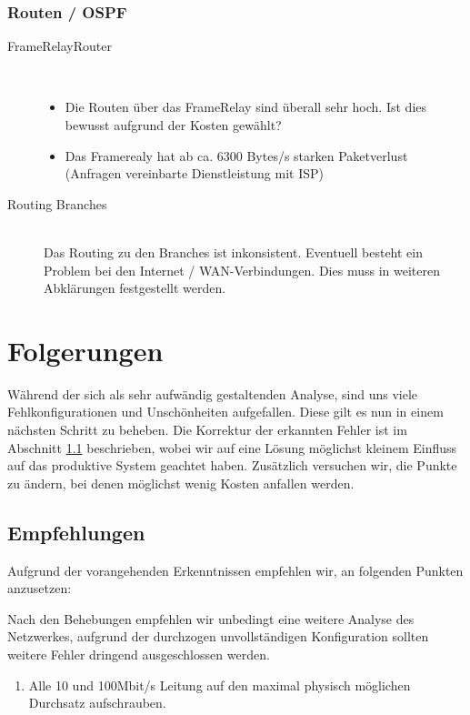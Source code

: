\subsubsection{Routen / OSPF}

\begin{description}
	\item[FrameRelayRouter] \hfill \\
		\begin{itemize}
			\item Die Routen über das FrameRelay sind überall sehr hoch. Ist dies bewusst aufgrund der Kosten gewählt?
			\item Das Framerealy hat ab ca. 6300 Bytes/s starken Paketverlust (Anfragen vereinbarte Dienstleistung mit ISP)
		\end{itemize}
	\item[Routing Branches] \hfill \\
		Das Routing zu den Branches ist inkonsistent. Eventuell besteht ein Problem bei den Internet / WAN-Verbindungen. Dies muss in weiteren Abklärungen festgestellt werden.
\end{description}

\section{Folgerungen}
Während der sich als sehr aufwändig gestaltenden Analyse, sind uns viele Fehlkonfigurationen und Unschönheiten aufgefallen. Diese gilt es nun in einem nächsten Schritt zu beheben. Die Korrektur der erkannten Fehler ist im Abschnitt \ref{sec:recommedations} beschrieben, wobei wir auf eine Lösung möglichst kleinem Einfluss auf das produktive System geachtet haben. Zusätzlich versuchen wir, die Punkte zu ändern, bei denen möglichst wenig Kosten anfallen werden.

\subsection{Empfehlungen}
\label{sec:recommedations}
Aufgrund der vorangehenden Erkenntnissen empfehlen wir, an folgenden Punkten anzusetzen:

Nach den Behebungen empfehlen wir unbedingt eine weitere Analyse des Netzwerkes, aufgrund der durchzogen unvollständigen Konfiguration sollten weitere Fehler dringend ausgeschlossen werden.

\begin{enumerate}
	\item Alle 10 und 100Mbit/s Leitung auf den maximal physisch möglichen Durchsatz aufschrauben.
\end{enumerate}

